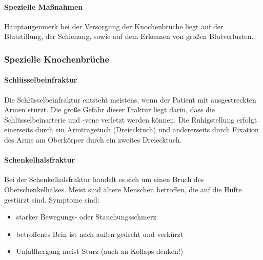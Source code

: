 \paragraph{Spezielle Maßnahmen}

Hauptaugenmerk bei der Versorgung der Knochenbrüche liegt auf der Blutstillung,
der Schienung, sowie auf dem Erkennen von großen Blutverlusten.


\subsubsection{Spezielle Knochenbrüche}

\paragraph{Schlüsselbeinfraktur} Die Schlüsselbeinfraktur entsteht meistens, wenn
der Patient mit ausgestreckten Armen stürzt. Die große Gefahr dieser Fraktur
liegt darin, dass die Schlüsselbeinarterie und -vene verletzt werden können. Die
Ruhigstellung erfolgt einerseits durch ein Armtragetuch (Dreiecktuch) und
andererseits durch Fixation des Arms am Oberkörper durch ein zweites Dreiecktuch.

\paragraph{Schenkelhalsfraktur} Bei der Schenkelhalsfraktur handelt es sich um
einen Bruch des Oberschenkelhalses. Meist sind ältere Menschen betroffen, die auf
die Hüfte gestürzt sind. Symptome sind:
\begin{itemize}
	\item starker Bewegungs- oder Stauchungsschmerz
	\item betroffenes Bein ist nach außen gedreht und verkürzt
	\item Unfallhergang meist Sturz (auch an Kollaps denken!)
\end{itemize}

